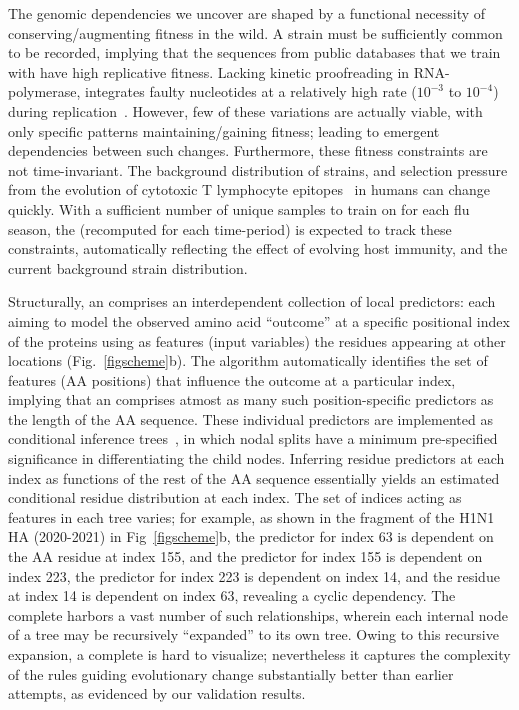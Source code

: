 \documentclass[onecolumn, compsoc,10pt]{IEEEtran}
\begin{document}
The genomic dependencies we uncover are shaped by  a  functional necessity of conserving/augmenting  fitness in the wild. A  strain must be sufficiently common  to be recorded, implying that the sequences from public databases that we train  with have  high replicative fitness. Lacking kinetic proofreading  in  RNA-polymerase,  \infl integrates  faulty nucleotides   at a relatively high rate ($10^{-3}$ to $10^{-4}$) during  replication~\cite{ahlquist2002rna,chen2006avian}. However, few   of these variations are actually viable, with only specific patterns  maintaining/gaining fitness;  leading to emergent dependencies between such changes. Furthermore, these fitness constraints are not time-invariant. The background distribution of strains, and selection pressure from the evolution of cytotoxic T lymphocyte  epitopes~\cite{woolthuis2016long,fan2012role,van2016differential,berkhoff2007assessment,van2012evasion} in humans can change quickly. With a sufficient number of unique samples to train on for each flu season, the \enet (recomputed for each time-period) is expected to  track these  constraints, automatically reflecting the effect of  evolving host immunity, and the current background strain distribution.  


Structurally, an \enet comprises an interdependent collection of  local predictors: each aiming to model the observed amino acid ``outcome'' at a specific positional index of the proteins using as features (input variables) the residues appearing  at other  locations  (Fig.~\ref{figscheme}b). The algorithm automatically identifies the set of features (AA positions) that influence the outcome at a particular index, implying that an \enet comprises atmost as many such  position-specific predictors as the length of the AA sequence. These individual predictors are implemented as conditional inference trees~\cite{Hothorn06unbiasedrecursive}, in which  nodal splits  have  a minimum pre-specified significance in differentiating the  child nodes. Inferring residue predictors at each  index as  functions of the rest of the AA sequence essentially yields an estimated conditional residue distribution  at each index. The set of indices acting as features in each tree varies; for example, as shown in the fragment of the  H1N1 HA \enet (2020-2021) in Fig~\ref{figscheme}b, the predictor for index 63 is dependent on the AA residue at index 155, and the predictor for index 155 is dependent on index 223, the predictor for index 223 is dependent on index 14, and the residue at index 14 is dependent on index 63, revealing a cyclic dependency. The complete \enet harbors a vast number of such  relationships, wherein each internal node of a tree may be recursively ``expanded'' to its own tree. Owing to this recursive expansion,  a complete \enet is hard to visualize; nevertheless it captures the complexity of the rules guiding evolutionary change substantially better than earlier attempts, as evidenced by our validation results.
\end{document}

